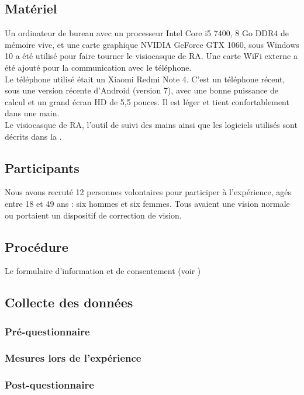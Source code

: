 \subsection{Matériel}
Un ordinateur de bureau avec un processeur Intel Core i5 7400, 8 Go DDR4 de mémoire vive, et une carte graphique NVIDIA GeForce GTX 1060, sous Windows 10 a été utilisé pour faire tourner le visiocasque de RA. Une carte WiFi externe a été ajouté pour la communication avec le téléphone.\\
Le téléphone utilisé était un Xiaomi Redmi Note 4. C'est un téléphone récent, sous une version récente d'Android (version 7), avec une bonne puissance de calcul et un grand écran HD de 5,5 pouces. Il est léger et tient confortablement dans une main.\\
Le visiocasque de RA, l'outil de suivi des mains ainsi que les logiciels utilisés sont décrits dans la .

\subsection{Participants}
Nous avons recruté 12 personnes volontaires pour participer à l'expérience, agés entre 18 et 49 ans : six hommes et six femmes. Tous avaient une vision normale ou portaient un dispositif de correction de vision.

\subsection{Procédure}
Le formulaire d'information et de consentement (voir )

\subsection{Collecte des données}
\subsubsection{Pré-questionnaire}

\subsubsection{Mesures lors de l'expérience}

\subsubsection{Post-questionnaire}

